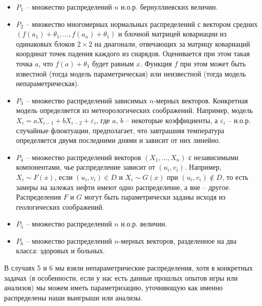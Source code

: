 \documentclass[10 pt,russian]{article}
\begin{document}
\begin{itemize}
\item $P_1$ -- множество распределений $n$ н.о.р. бернуллиевских величин.
\item $P_2$ -- множество многомерных нормальных распределений с вектором средних $(f(a_1)+\theta_1,\dotsc, f(a_n)+\theta_1)$ и блочной матрицей ковариации из одинаковых блоков $2\times 2$ на диагонали, отвечающих за матрицу ковариаций координат точек падения каждого из снарядов. Оценивается при этом такая точка $a$, что $f(a)+\theta_1$ будет равным $x$. Функция $f$ при этом может быть известной (тогда модель параметрическая) или неизвестной (тогда модель непараметрическая).
\item $P_3$ -- множество распределений зависимых $n$-мерных векторов. Конкретная модель определяется из метеорологических соображений. Например, модель $X_{i} = a X_{i-1} + b X_{i-2}+\varepsilon_i$, где $a$, $b$ -- некоторые коэффициенты, а $\varepsilon_i$ -- н.о.р. случайные флюктуации, предполагает, что завтрашняя температура определяется двумя последними днями и зависит от них линейно.
\item $P_4$ -- множество распределений векторов $(X_1,\dotsc, X_n)$ с независимыми компонентами, чье распределение зависит от $(u_i,v_i)$. Например, $X_i\sim F(x)$, если $(u_i, v_i)\in D$ и $X_i\sim G(x)$ при $(u_i,v_i)\not\in D$, то есть замеры на залежах нефти имеют одно распределение, а вне -- другое. Распределения $F$ и $G$ могут быть параметрически заданы исходя из геологических соображений.
\item $P_5$ -- множество распределений $n$ н.о.р. величин.
\item $P_6$ -- множество распределений $n$-мерных векторов, разделенное на два класса: здоровых и больных. 
\end{itemize}
В случаях 5 и 6 мы взяли непараметрические распределения, хотя в конкретных задачах (в особенности, если у нас есть данные прошлых опытов игры или анализов) мы можем иметь параметризацию, уточняющую как именно распределены наши выигрыши или анализы. 
\end{document}

